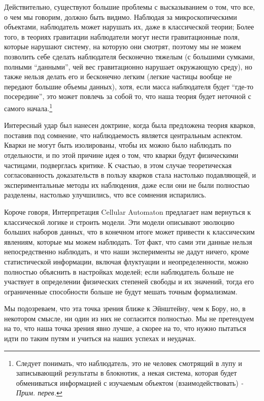 \documentclass[main.tex]{subfiles}
\begin{document}
Действительно, существуют большие проблемы с высказыванием о том, что все, о чем мы говорим, должно быть видимо. Наблюдая за микроскопическими объектами, наблюдатель может нарушать их, даже в классической теории; Более того, в теориях гравитации наблюдатели могут нести гравитационные поля, которые нарушают систему, на которую они смотрят, поэтому мы не можем позволить себе сделать наблюдателя бесконечно тяжелым (с большими сумками, полными ``данными'', чей вес гравитационно нарушает окружающую среду), но также нельзя делать его и бесконечно легким (легкие частицы вообще не передают большие объемы данных), хотя, если масса наблюдателя будет ``где-то посередине'', это может повлечь за собой то, что наша теория будет неточной с самого начала.\footnote{Следует понимать, что наблюдатель, это не человек смотрящий в лупу и записывающий результаты в блокнотик, а некая система, которая будет обмениваться информацией с изучаемым объектом (взаимодействовать)\textit{ - Прим. перев.}}

Интересный удар был нанесен доктрине, когда была предложена теория кварков, поставив под сомнение, что наблюдаемость является центральным аспектом. Кварки не могут быть изолированы, чтобы их можно было наблюдать по отдельности, и по этой причине идея о том, что кварки будут физическими частицами, подверглась критике. К счастью, в этом случае теоретическая согласованность доказательств в пользу кварков стала настолько подавляющей, и экспериментальные методы их наблюдения, даже если они не были полностью разделены, настолько улучшились, что все сомнения испарились.

Короче говоря, Интерпретация Cellular Automaton предлагает нам вернуться к классической логике и строить модели. Эти модели описывают эволюцию больших наборов данных, что в конечном итоге может привести к классическим явлениям, которые мы можем наблюдать. Тот факт, что сами эти данные нельзя непосредственно наблюдать, и что наши эксперименты не дадут ничего, кроме статистической информации, включая флуктуации и неопределенности, можно полностью объяснить в настройках моделей; если наблюдатель больше не участвует в определении физических степеней свободы и их значений, тогда его ограниченные способности больше не будут мешать точным формализмам.

Мы подозреваем, что эта точка зрения ближе к Эйнштейну, чем к Бору, но, в некотором смысле, ни один из них не согласится полностью. Мы не претендуем на то, что наша точка зрения явно лучше, а скорее на то, что нужно пытаться идти по таким путям и учиться на наших успехах и неудачах.
\end{document}
